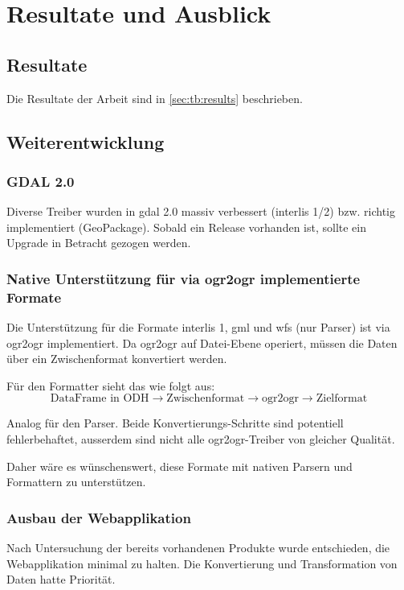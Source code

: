 \chapter{Resultate und Ausblick}

\section{Resultate}
Die Resultate der Arbeit sind in \vref{sec:tb:results} beschrieben.

\section{Weiterentwicklung} \label{sec:tb:further-dev}

\subsection{GDAL 2.0}
Diverse Treiber wurden in \gls{gdal} 2.0 massiv verbessert (\gls{interlis} 1/2) bzw. richtig implementiert (GeoPackage). Sobald ein Release vorhanden ist, sollte ein Upgrade in Betracht gezogen werden.

\subsection{Native Unterstützung für via ogr2ogr implementierte Formate}
Die Unterstützung für die Formate \gls{interlis} 1, \acs{gml} und \acs{wfs} (nur Parser) ist via ogr2ogr implementiert. Da ogr2ogr auf Datei-Ebene operiert, müssen die Daten über ein Zwischenformat konvertiert werden.

Für den Formatter sieht das wie folgt aus:
$$ \text{DataFrame in ODH} \to \text{Zwischenformat} \to \text{ogr2ogr} \to \text{Zielformat} $$

Analog für den Parser. Beide Konvertierungs-Schritte sind potentiell fehlerbehaftet, ausserdem sind nicht alle ogr2ogr-Treiber von gleicher Qualität.

Daher wäre es wünschenswert, diese Formate mit nativen Parsern und Formattern zu unterstützen. 

\subsection{Ausbau der Webapplikation}
Nach Untersuchung der bereits vorhandenen Produkte wurde entschieden, die Webapplikation minimal zu halten. Die Konvertierung und Transformation von Daten hatte Priorität.

